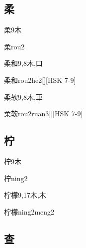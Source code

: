 \subsection*{柔}

\begin{Entry}{柔}{9}{⽊}
  \begin{Phonetics}{柔}{rou2}
  \end{Phonetics}
\end{Entry}

\begin{Entry}{柔和}{9,8}{⽊,⼝}
  \begin{Phonetics}{柔和}{rou2he2}[][HSK 7-9]
  \end{Phonetics}
\end{Entry}

\begin{Entry}{柔软}{9,8}{⽊,⾞}
  \begin{Phonetics}{柔软}{rou2ruan3}[][HSK 7-9]
  \end{Phonetics}
\end{Entry}

\subsection*{柠}

\begin{Entry}{柠}{9}{⽊}
  \begin{Phonetics}{柠}{ning2}
  \end{Phonetics}
\end{Entry}

\begin{Entry}{柠檬}{9,17}{⽊,⽊}
  \begin{Phonetics}{柠檬}{ning2meng2}
  \end{Phonetics}
\end{Entry}

\subsection*{查}

